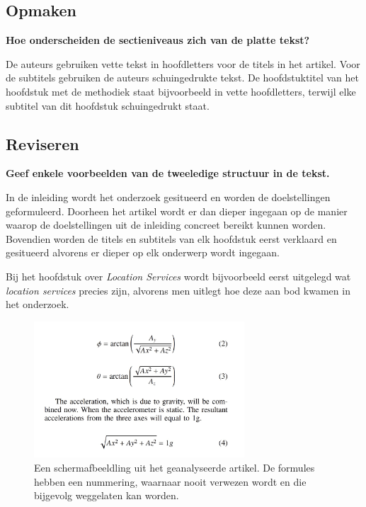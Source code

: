 \documentclass[kulak]{kulakarticle} %
\begin{document}
\subsection*{Opmaken}

\textbf{Hoe onderscheiden de sectieniveaus zich van de platte tekst?}

\noindent De auteurs gebruiken vette tekst in hoofdletters voor de titels in het artikel. Voor de subtitels gebruiken de auteurs schuingedrukte tekst. De hoofdstuktitel van het hoofdstuk met de methodiek staat bijvoorbeeld in vette hoofdletters, terwijl elke subtitel van dit hoofdstuk schuingedrukt staat.

\subsection*{Reviseren}

\textbf{Geef enkele voorbeelden van de tweeledige structuur in de tekst.}

\noindent In de inleiding wordt het onderzoek gesitueerd en worden de doelstellingen geformuleerd. Doorheen het artikel wordt er dan dieper ingegaan op de manier waarop de doelstellingen uit de inleiding concreet bereikt kunnen worden.  Bovendien worden de titels en subtitels van elk hoofdstuk eerst verklaard en gesitueerd alvorens er dieper op elk onderwerp wordt ingegaan.

Bij het hoofdstuk over \textit{Location Services} wordt bijvoorbeeld eerst uitgelegd wat \textit{location services} precies zijn, alvorens men uitlegt hoe deze aan bod kwamen in het onderzoek.

\newpage

\begin{figure}
	\centering
	\includegraphics[width= 0.7\textwidth]{formules}
	\caption{Een schermafbeeldling uit het geanalyseerde artikel. De formules hebben een nummering, waarnaar nooit verwezen wordt en die bijgevolg weggelaten kan worden.}
	\label{fig:formules}
\end{figure}



\end{document}

